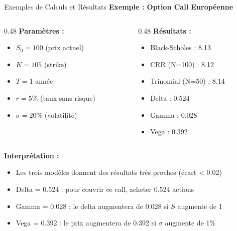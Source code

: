 \documentclass[aspectratio=169, 10pt]{beamer}
\begin{document}
\begin{frame}{Exemples de Calculs et Résultats}
    \textbf{Exemple : Option Call Européenne}
    
    \begin{columns}[T]
        \begin{column}{0.48\textwidth}
            \textbf{Paramètres :}
            \begin{itemize}
                \item $S_0 = 100$ (prix actuel)
                \item $K = 105$ (strike)
                \item $T = 1$ année
                \item $r = 5\%$ (taux sans risque)
                \item $\sigma = 20\%$ (volatilité)
            \end{itemize}
        \end{column}
        \begin{column}{0.48\textwidth}
            \textbf{Résultats :}
            \begin{itemize}
                \item Black-Scholes : 8.13
                \item CRR (N=100) : 8.12
                \item Trinomial (N=50) : 8.14
                \item Delta : 0.524
                \item Gamma : 0.028
                \item Vega : 0.392
            \end{itemize}
        \end{column}
    \end{columns}
    
    \vspace{0.3cm}
    \textbf{Interprétation :}
    \begin{itemize}
        \item Les trois modèles donnent des résultats très proches (écart < 0.02)
        \item Delta = 0.524 : pour couvrir ce call, acheter 0.524 actions
        \item Gamma = 0.028 : le delta augmentera de 0.028 si $S$ augmente de 1
        \item Vega = 0.392 : le prix augmentera de 0.392 si $\sigma$ augmente de 1\%
    \end{itemize}
\end{frame}
\end{document}
